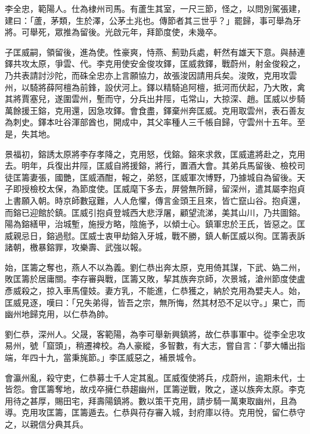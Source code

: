 \begin{pinyinscope}
 李全忠，範陽人。仕為棣州司馬。有蘆生其室，一尺三節，怪之，以問別駕張建，建曰：「蘆，茅類，生於澤，公茅土兆也。傳節者其三世乎？」罷歸，事可舉為牙將。可舉死，眾推為留後。光啟元年，拜節度使，未幾卒。



 子匡威嗣，領留後，進為使。性豪爽，恃燕、薊勁兵處，軒然有雄天下意。與赫連鐸共攻太原，爭雲、代。李克用使安金俊攻鐸，匡威救鐸，戰蔚州，射金俊殺之，乃共表請討沙陀，而硃全忠亦上言願協力，故張浚因請用兵矣。浚敗，克用攻雲州，以騎將薛阿檀為前鋒，設伏河上。鐸以精騎追阿檀，抵河而伏起，乃大敗，禽其將賈塞兒，遂圍雲州，塹而守，分兵出井陘，屯常山，大掠深、趙。匡威以步騎萬餘援王鎔，克用還，因急攻鐸。會食盡，鐸棄州奔匡威。克用取雲州，表石善友為刺史。鐸本吐谷渾部酋也，開成中，其父率種人三千帳自歸，守雲州十五年。至是，失其地。



 景福初，鎔誘太原將李存孝降之，克用怒，伐鎔。鎔來求救，匡威遣將赴之，克用去。明年，兵復出井陘，匡威自將援鎔，將行，置酒大會。其弟兵馬留後、檢校司徒匡籌妻張，國艷，匡威酒酣，報之，弟怒，匡威軍次博野，乃據城自為留後。天子即授檢校太保，為節度使。匡威麾下多去，屏營無所歸，留深州，遣其屬李抱貞上書願入朝。時京師數寇難，人人危懼，傳言金頭王且來，皆亡竄山谷。抱貞還，而鎔已迎館於鎮。匡威引抱貞登城西大悲浮屠，顧望流涕，美其山川，乃共圖鎔。陽為鎔繕甲，治城塹，施授方略，陰施予，以傾士心。鎮軍忠於王氏，皆惡之。匡威親忌日，鎔過慰。匡威士衷甲劫鎔入牙城，戰不勝，鎮人斬匡威以徇。匡籌表訴諸朝，檄暴鎔罪，攻樂壽、武強以報。



 始，匡籌之奪也，燕人不以為義。劉仁恭出奔太原，克用倚其謀，下武、媯二州，敗匡籌於居庸關。李存審與戰，匡籌又敗，挈其族奔京師，次景城，滄州節度使盧彥威殺之，掠入車馬僮妓。妻方乳，不能進，仁恭獲之，納於克用為嬖夫人。始，匡威見逐，嘆曰：「兄失弟得，皆吾之宗，無所悔，然其材恐不足以守。」果亡，而幽州地歸克用，以仁恭為帥。



 劉仁恭，深州人。父晟，客範陽，為李可舉新興鎮將，故仁恭事軍中。從李全忠攻易州，號「窟頭」，稍遷裨校。為人豪縱，多智數，有大志，嘗自言：「夢大幡出指端，年四十九，當秉旄節。」李匡威惡之，補景城令。



 會瀛州亂，殺守吏，仁恭募士千人定其亂。匡威復使將兵，戍蔚州，逾期未代，士皆怨。會匡籌奪地，故戍卒擁仁恭趨幽州，匡籌逆戰，敗之，遂以族奔太原。李克用待之甚厚，賜田宅，拜壽陽鎮將。數以策干克用，請步騎一萬東取幽州，且為導。克用攻匡籌，匡籌遁去。仁恭與苻存審入城，封府庫以待。克用悅，留仁恭守之，以親信分典其兵。




\end{pinyinscope}
